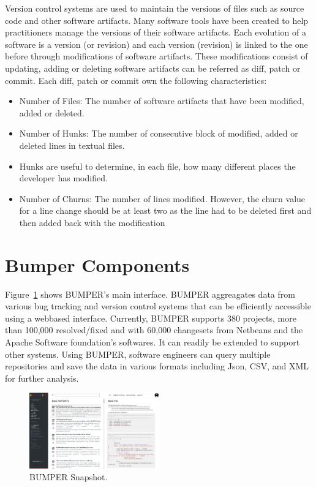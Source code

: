 \documentclass[conference]{IEEEtran}
\begin{document}
Version control systems are used to maintain the versions of files such as source code and other software artifacts.
Many software tools have been created to help practitioners manage the versions of their software artifacts.
Each evolution of a software is a version (or revision) and each version (revision) is linked to the one before through modifications of software artifacts.
These modifications consist of updating, adding or deleting software artifacts can be referred as diff, patch or commit.
Each diff, patch or commit own the following characteristics:

\begin{itemize}
  \item  Number of Files: The number of software artifacts that have been modified, added or deleted.
  \item Number of Hunks: The number of consecutive block of modified, added or deleted lines in textual files.
  \item Hunks are useful to determine, in each file, how many different places the developer has modified.
  \item Number of Churns: The number of lines modified.
  However, the churn value for a line change should be at least two as the line had to be deleted first and then added back with the modification
\end{itemize}

\section{Bumper Components}
\label{sec:Bumper Components}

Figure~\ref{fig:bumper-snapshot}   shows BUMPER’s main interface.
BUMPER aggreagates data from various bug tracking and version control systems that can be efficiently accessible using a webbased interface.
Currently, BUMPER supports 380 projects, more than 100,000 resolved/fixed and with 60,000 changesets from Netbeans and the Apache Software foundation’s softwares.
It can readily be extended to support other systems.
Using BUMPER, software engineers can query multiple repositories and save the data in various formats including Json, CSV, and XML for further analysis.

\begin{figure}[h!]
  \centering
    \includegraphics[width=0.5\textwidth]{media/interface.png}
    \caption{ BUMPER Snapshot.\label{fig:bumper-snapshot}}
\end{figure}
\end{document}
